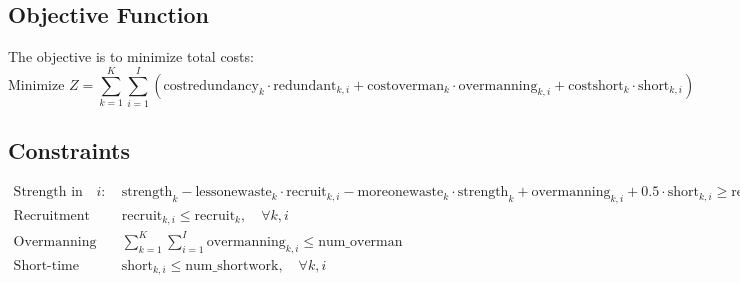 \documentclass{article}
\begin{document}
\subsection*{Objective Function}
The objective is to minimize total costs:
\[
\text{Minimize } Z = \sum_{k=1}^{K} \sum_{i=1}^{I} \left( \text{costredundancy}_{k} \cdot \text{redundant}_{k, i} + \text{costoverman}_{k} \cdot \text{overmanning}_{k, i} + \text{costshort}_{k} \cdot \text{short}_{k, i} \right)
\]

\subsection*{Constraints}
\begin{align}
    \text{Strength in year } i: & \quad \text{strength}_{k} - \text{lessonewaste}_{k} \cdot \text{recruit}_{k, i} - \text{moreonewaste}_{k} \cdot \text{strength}_{k} + \text{overmanning}_{k, i} + 0.5 \cdot \text{short}_{k, i} \geq \text{requirement}_{k, i}, \quad \forall k, i \\
    \text{Recruitment limits:} & \quad \text{recruit}_{k, i} \leq \text{recruit}_{k}, \quad \forall k, i \\
    \text{Overmanning limits:} & \quad \sum_{k=1}^{K} \sum_{i=1}^{I} \text{overmanning}_{k, i} \leq \text{num\_overman} \\
    \text{Short-time limits:} & \quad \text{short}_{k, i} \leq \text{num\_shortwork}, \quad \forall k, i
\end{align}
\end{document}
